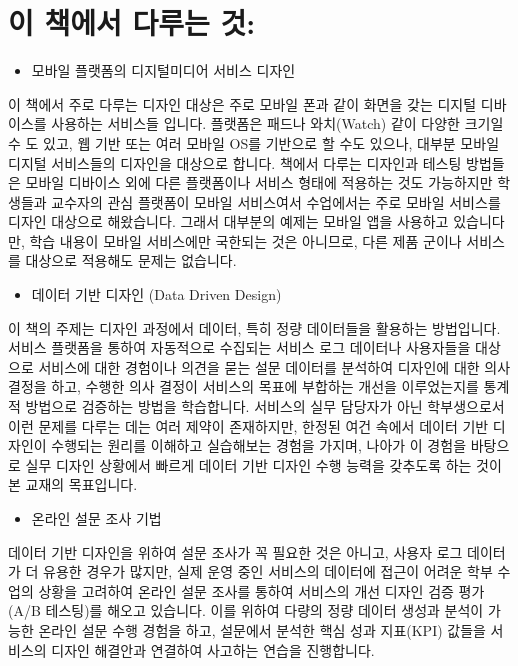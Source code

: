 \documentclass[
  letterpaper,
]{book}
\providecommand{\tightlist}{%
  \setlength{\itemsep}{0pt}\setlength{\parskip}{0pt}}\usepackage{longtable,booktabs,array}
\begin{document}
\section*{이 책에서 다루는
것:}\label{uxc774-uxcc45uxc5d0uxc11c-uxb2e4uxb8e8uxb294-uxac83}


\begin{itemize}
\tightlist
\item
  모바일 플랫폼의 디지털미디어 서비스 디자인
\end{itemize}

이 책에서 주로 다루는 디자인 대상은 주로 모바일 폰과 같이 화면을 갖는
디지털 디바이스를 사용하는 서비스들 입니다. 플랫폼은 패드나 와치(Watch)
같이 다양한 크기일 수 도 있고, 웹 기반 또는 여러 모바일 OS를 기반으로 할
수도 있으나, 대부분 모바일 디지털 서비스들의 디자인을 대상으로 합니다.
책에서 다루는 디자인과 테스팅 방법들은 모바일 디바이스 외에 다른
플랫폼이나 서비스 형태에 적용하는 것도 가능하지만 학생들과 교수자의 관심
플랫폼이 모바일 서비스여서 수업에서는 주로 모바일 서비스를 디자인
대상으로 해왔습니다. 그래서 대부분의 예제는 모바일 앱을 사용하고
있습니다만, 학습 내용이 모바일 서비스에만 국한되는 것은 아니므로, 다른
제품 군이나 서비스를 대상으로 적용해도 문제는 없습니다.

\begin{itemize}
\tightlist
\item
  데이터 기반 디자인 (Data Driven Design)
\end{itemize}

이 책의 주제는 디자인 과정에서 데이터, 특히 정량 데이터들을 활용하는
방법입니다. 서비스 플랫폼을 통하여 자동적으로 수집되는 서비스 로그
데이터나 사용자들을 대상으로 서비스에 대한 경험이나 의견을 묻는 설문
데이터를 분석하여 디자인에 대한 의사 결정을 하고, 수행한 의사 결정이
서비스의 목표에 부합하는 개선을 이루었는지를 통계적 방법으로 검증하는
방법을 학습합니다. 서비스의 실무 담당자가 아닌 학부생으로서 이런 문제를
다루는 데는 여러 제약이 존재하지만, 한정된 여건 속에서 데이터 기반
디자인이 수행되는 원리를 이해하고 실습해보는 경험을 가지며, 나아가 이
경험을 바탕으로 실무 디자인 상황에서 빠르게 데이터 기반 디자인 수행
능력을 갖추도록 하는 것이 본 교재의 목표입니다.

\begin{itemize}
\tightlist
\item
  온라인 설문 조사 기법
\end{itemize}

데이터 기반 디자인을 위하여 설문 조사가 꼭 필요한 것은 아니고, 사용자
로그 데이터가 더 유용한 경우가 많지만, 실제 운영 중인 서비스의 데이터에
접근이 어려운 학부 수업의 상황을 고려하여 온라인 설문 조사를 통하여
서비스의 개선 디자인 검증 평가(A/B 테스팅)를 해오고 있습니다. 이를
위하여 다량의 정량 데이터 생성과 분석이 가능한 온라인 설문 수행 경험을
하고, 설문에서 분석한 핵심 성과 지표(KPI) 값들을 서비스의 디자인
해결안과 연결하여 사고하는 연습을 진행합니다.
\end{document}
